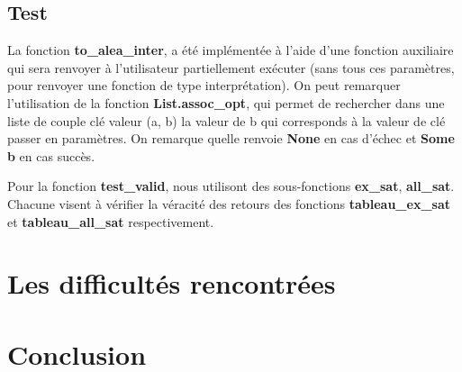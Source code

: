 \documentclass[12pt]{article}
\begin{document}
    \subsection{Test}

    La fonction \textbf{to\_alea\_inter}, a été implémentée à l'aide d'une 
    fonction auxiliaire qui sera renvoyer à l'utilisateur partiellement 
    exécuter (sans tous ces paramètres, pour renvoyer une fonction de type 
    interprétation). On peut remarquer l'utilisation de la fonction 
    \textbf{List.assoc\_opt}, qui permet de rechercher dans une liste de couple 
    clé valeur (a, b) la valeur de b qui corresponds à la valeur de clé passer en 
    paramètres. On remarque quelle renvoie \textbf{None} en cas d'échec et 
    \textbf{Some b} en cas succès.

    \vphantom{}

    Pour la fonction \textbf{test\_valid}, nous utilisont des sous-fonctions 
    \textbf{ex\_sat}, \textbf{all\_sat}. Chacune visent à vérifier la véracité
    des retours des fonctions \textbf{tableau\_ex\_sat} et 
    \textbf{tableau\_all\_sat} respectivement.

    \section{Les difficultés rencontrées}
    
    \section{Conclusion}
\end{document}
